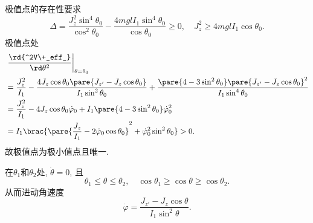 \documentclass[../LectureNotes.tex]{subfiles}
\begin{document}
极值点的存在性要求
\[ \Delta = \frac{J_z^2\sin^4\theta_0}{\cos^2\theta_0} - \frac{4mglI_1\sin^4\theta_0}{\cos\theta_0} \ge 0,\quad J_z^2 \ge 4mglI_1\cos\theta_0. \]
极值点处
\begin{align*}
    & \left.\frac{\rd{^2V\+_eff_}}{\rd\theta^2}\right\vert_{\theta=\theta_0}\\  &= \frac{J_z^2}{I_1} - \frac{4J_z\cos\theta_0\pare{J_{z'} - J_z\cos\theta_0}}{I_1\sin^2\theta_0} + \frac{\pare{4-3\sin^2\theta_0}\pare{J_{z'}-J_z\cos\theta_0}^2}{I_1\sin^4\theta_0} \\
    &= \frac{J_z^2}{I_1} - 4J_z\cos\theta_0 \dot\varphi_0 + I_1\pare{4-3\sin^2\theta_0}\dot\varphi_0^2 \\
    &= I_1 \brac{\pare{\frac{J_z}{I_1} - 2\dot\varphi_0\cos\theta_0}^2 + \dot\varphi_0^2\sin^2\theta_0} > 0.
\end{align*}
故极值点为极小值点且唯一.
\par
在$\theta_1$和$\theta_2$处, $\dot\theta = 0$, 且
\[ \theta_1 \le \theta \le \theta_2,\quad \cos\theta_1 \ge \cos\theta \ge \cos\theta_2. \]
从而进动角速度
\[ \dot\varphi = \frac{J_{z'} - J_z\cos\theta}{I_1\sin^2\theta}. \]
\begin{figure}[ht]
    \centering
    \begin{subfigure}{3.9cm}
        \centering
        \caption{}
        \label{fig:Lagrange陀螺A}
    \end{subfigure}
    \begin{subfigure}{3.9cm}
        \centering
        \caption{}
        \label{fig:Lagrange陀螺B}
    \end{subfigure}
    \begin{subfigure}{3.9cm}
        \centering
        \caption{}
        \label{fig:Lagrange陀螺C}
    \end{subfigure}
    \begin{subfigure}{3.9cm}
        \centering
        \caption{}
        \label{fig:Lagrange陀螺D}
    \end{subfigure}
    \begin{subfigure}{3.9cm}
        \centering
        \caption{}
        \label{fig:Lagrange陀螺E}
    \end{subfigure}
    \caption{}
\end{figure}
\end{document}
